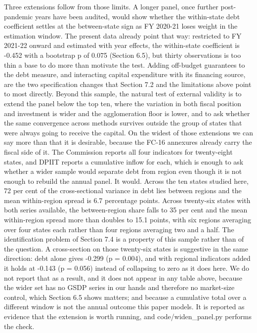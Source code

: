 \documentclass[12pt,a4paper]{article}
\begin{document}
Three extensions follow from those limits. A longer panel, once further post-pandemic years have been audited, would show whether the within-state debt coefficient settles at the between-state sign as FY 2020-21 loses weight in the estimation window. The present data already point that way: restricted to FY 2021-22 onward and estimated with year effects, the within-state coefficient is -0.452 with a bootstrap p of 0.075 (Section 6.5), but thirty observations is too thin a base to do more than motivate the test. Adding off-budget guarantees to the debt measure, and interacting capital expenditure with its financing source, are the two specification changes that Section 7.2 and the limitations above point to most directly. Beyond this sample, the natural test of external validity is to extend the panel below the top ten, where the variation in both fiscal position and investment is wider and the agglomeration floor is lower, and to ask whether the same convergence across methods survives outside the group of states that were always going to receive the capital. On the widest of those extensions we can say more than that it is desirable, because the FC-16 annexures already carry the fiscal side of it. The Commission reports all four indicators for twenty-eight states, and DPIIT reports a cumulative inflow for each, which is enough to ask whether a wider sample would separate debt from region even though it is not enough to rebuild the annual panel. It would. Across the ten states studied here, 72 per cent of the cross-sectional variance in debt lies between regions and the mean within-region spread is 6.7 percentage points. Across twenty-six states with both series available, the between-region share falls to 35 per cent and the mean within-region spread more than doubles to 15.1 points, with six regions averaging over four states each rather than four regions averaging two and a half. The identification problem of Section 7.4 is a property of this sample rather than of the question. A cross-section on those twenty-six states is suggestive in the same direction: debt alone gives -0.299 (p = 0.004), and with regional indicators added it holds at -0.143 (p = 0.056) instead of collapsing to zero as it does here. We do not report that as a result, and it does not appear in any table above, because the wider set has no GSDP series in our hands and therefore no market-size control, which Section 6.5 shows matters; and because a cumulative total over a different window is not the annual outcome this paper models. It is reported as evidence that the extension is worth running, and code/widen\_panel.py performs the check.
\end{document}
